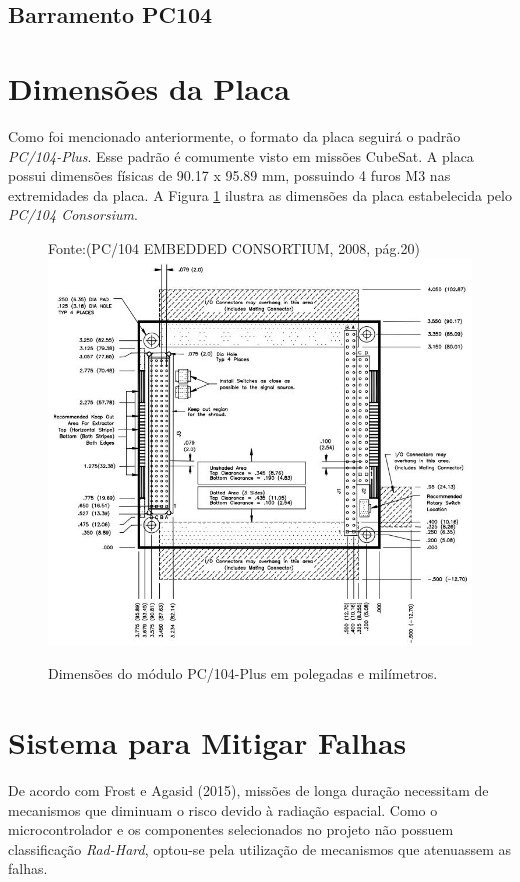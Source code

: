 \subsection{Barramento PC104}


\section{Dimensões da Placa}

Como foi mencionado anteriormente, o formato da placa seguirá o padrão \textit{PC/104-Plus}. Esse padrão é comumente visto em missões CubeSat. A placa possui dimensões físicas de 90.17 x 95.89 mm, possuindo 4 furos M3 nas extremidades da placa. A Figura \ref{pc104} ilustra as dimensões da placa estabelecida pelo \textit{PC/104 Consorsium}.

\begin{figure}[h]
	\centering
	Fonte:(PC/104 EMBEDDED CONSORTIUM, 2008, pág.20)
	\includegraphics[keepaspectratio=true,scale=0.7]{figuras/pc104_32bit.PNG}
	\caption{Dimensões do módulo PC/104-Plus em polegadas e milímetros.}
	\label{pc104}
\end{figure}

\section{Sistema para Mitigar Falhas}

De acordo com  Frost e Agasid (2015), missões de longa duração necessitam de mecanismos que diminuam o risco devido à radiação espacial. Como o microcontrolador e os componentes selecionados no projeto não possuem classificação \textit{Rad-Hard}, optou-se pela utilização de mecanismos que atenuassem as falhas. 

